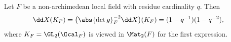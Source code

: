Let $F$ be a non-archimedean local field with residue cardinality $q$. Then
\[
  \dd X(K_F)=\bigl(\abs{\det g}_F^{-2}\dd X\bigr)(K_F)=(1-q^{-1})(1-q^{-2}),
\]
where $K_F=\GL_2(\Ocal_F)$ is viewed in $\Mat_2(F)$ for the first expression.
